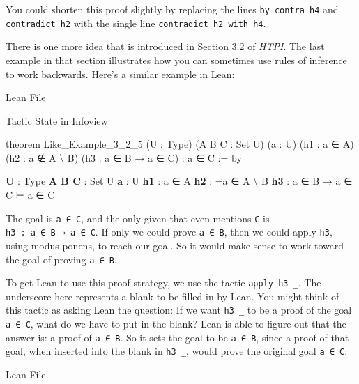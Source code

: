 \documentclass[
  letterpaper,
  DIV=11,
  numbers=noendperiod]{scrreprt}
\newenvironment{Shaded}{\begin{snugshade}}{\end{snugshade}}
\newcommand{\InformationTok}[1]{\textcolor[rgb]{0.37,0.37,0.37}{#1}}
\newcommand{\KeywordTok}[1]{\textcolor[rgb]{0.00,0.23,0.31}{#1}}
\newcommand{\NormalTok}[1]{\textcolor[rgb]{0.00,0.23,0.31}{#1}}
\renewcommand{\KeywordTok}[1]{\textcolor[HTML]{0000FF}{#1}}
\renewcommand{\InformationTok}[1]{\textcolor[HTML]{D2691E}{\textbf{#1}}}
\begin{document}
You could shorten this proof slightly by replacing the lines
\texttt{by\_contra\ h4} and \texttt{contradict\ h2} with the single line
\texttt{contradict\ h2\ with\ h4}.

There is one more idea that is introduced in Section 3.2 of \emph{HTPI}.
The last example in that section illustrates how you can sometimes use
rules of inference to work backwards. Here's a similar example in Lean:

Lean File

Tactic State in Infoview

\begin{Shaded}
\begin{Highlighting}[]
\KeywordTok{theorem}\NormalTok{ Like\_Example\_3\_2\_5}
\NormalTok{(U : Type) (A B C : Set U) (a : U)}
\NormalTok{(h1 : a ∈ A) (h2 : a ∉ A \textbackslash{} B)}
\NormalTok{(h3 : a ∈ B → a ∈ C) : a ∈ C := }\KeywordTok{by}
\end{Highlighting}
\end{Shaded}

\begin{Shaded}
\begin{Highlighting}[]
\InformationTok{U }\NormalTok{: Type}
\InformationTok{A B C }\NormalTok{: Set U}
\InformationTok{a }\NormalTok{: U}
\InformationTok{h1 }\NormalTok{: a ∈ A}
\InformationTok{h2 }\NormalTok{: ¬a ∈ A \textbackslash{} B}
\InformationTok{h3 }\NormalTok{: a ∈ B → a ∈ C}
\NormalTok{⊢ a ∈ C}
\end{Highlighting}
\end{Shaded}

The goal is \texttt{a\ ∈\ C}, and the only given that even mentions
\texttt{C} is \texttt{h3\ :\ a\ ∈\ B\ →\ a\ ∈\ C}. If only we could
prove \texttt{a\ ∈\ B}, then we could apply \texttt{h3}, using modus
ponens, to reach our goal. So it would make sense to work toward the
goal of proving \texttt{a\ ∈\ B}.

To get Lean to use this proof strategy, we use the tactic
\texttt{apply\ h3\ \_}. The underscore here represents a blank to be
filled in by Lean. You might think of this tactic as asking Lean the
question: If we want \texttt{h3\ \_} to be a proof of the goal
\texttt{a\ ∈\ C}, what do we have to put in the blank? Lean is able to
figure out that the answer is: a proof of \texttt{a\ ∈\ B}. So it sets
the goal to be \texttt{a\ ∈\ B}, since a proof of that goal, when
inserted into the blank in \texttt{h3\ \_}, would prove the original
goal \texttt{a\ ∈\ C}:

Lean File
\end{document}
